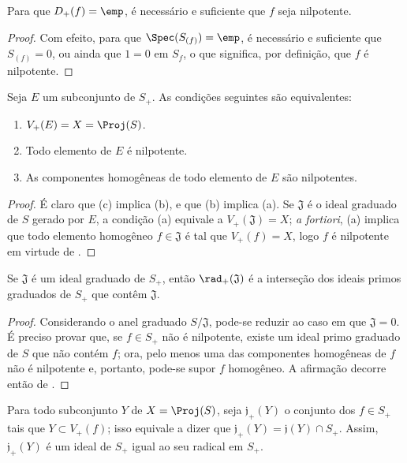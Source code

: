 \documentclass[oneside,10pt]{amsart}
\let\EGAOriginalLabel\label
\renewcommand{\label}[1]{\phantomsection\EGAOriginalLabel{#1}}
\begin{document}
\begin{corollary}[2.3.7]
\label{II.2.3.7}
Para que $D_+(f)=\emp$, é necessário e suficiente que $f$ seja nilpotente.
\end{corollary}

\begin{proof}
Com efeito, para que $\Spec(S_{(f)})=\emp$, é necessário e suficiente que $S_{(f)}=0$, ou ainda que $1=0$ em $S_f$, o que significa, por definição, que $f$ é nilpotente.
\end{proof}

\begin{corollary}[2.3.8]
\label{II.2.3.8}
Seja $E$ um subconjunto de $S_+$.
As condições seguintes são equivalentes:
\begin{enumerate}
  \item[\rm(a)] $V_+(E)=X=\Proj(S)$.
  \item[\rm(b)] Todo elemento de $E$ é nilpotente.
  \item[\rm(c)] As componentes homogêneas de todo elemento de $E$ são nilpotentes.
\end{enumerate}
\end{corollary}

\begin{proof}
É claro que (c) implica (b), e que (b) implica (a).
Se $\mathfrak{J}$ é o ideal graduado de $S$ gerado por $E$, a condição (a) equivale a $V_+(\mathfrak{J})=X$; \emph{a fortiori}, (a) implica que todo elemento homogêneo $f\in\mathfrak{J}$ é tal que $V_+(f)=X$, logo $f$ é nilpotente em virtude de .
\end{proof}

\begin{corollary}[2.3.9]
\label{II.2.3.9}
Se $\mathfrak{J}$ é um ideal graduado de $S_+$, então $\rad_+(\mathfrak{J})$ é a interseção dos ideais primos graduados de $S_+$ que contêm $\mathfrak{J}$.
\end{corollary}

\begin{proof}
Considerando o anel graduado $S/\mathfrak{J}$, pode-se reduzir ao caso em que $\mathfrak{J}=0$.
É preciso provar que, se $f\in S_+$ não é nilpotente, existe um ideal primo graduado de $S$ que não contém $f$; ora, pelo menos uma das componentes homogêneas de $f$ não é nilpotente e, portanto, pode-se supor $f$ homogêneo.
A afirmação decorre então de .
\end{proof}

\begin{env}[2.3.10]
\label{II.2.3.10}
Para todo subconjunto $Y$ de $X=\Proj(S)$, seja $\mathfrak{j}_+(Y)$ o conjunto dos $f\in S_+$ tais que $Y\subset V_+(f)$; isso equivale a dizer que $\mathfrak{j}_+(Y)=\mathfrak{j}(Y)\cap S_+$.
Assim, $\mathfrak{j}_+(Y)$ é um ideal de $S_+$ igual ao seu radical em $S_+$.
\end{env}
\end{document}
